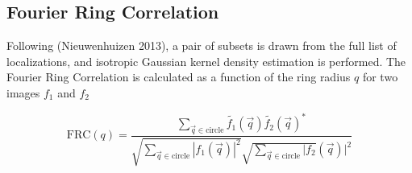 \documentclass{ucetd}
\begin{document}






\subsection{Fourier Ring Correlation}

Following (Nieuwenhuizen 2013), a pair of subsets is drawn from the full list of localizations, and isotropic Gaussian kernel density estimation is performed. The Fourier Ring Correlation is calculated as a function of the ring radius $q$ for two images $f_{1}$ and $f_{2}$

\begin{equation*}
\mathrm{FRC}(q) = \frac{\sum_{\vec{q}\in\mathrm{circle}}\tilde{f_{1}}(\vec{q})\tilde{f_{2}}(\vec{q})^{*}}{\sqrt{\sum_{\vec{q}\in\mathrm{circle}}|f_{1}(\vec{q})|^{2}}\sqrt{\sum_{\vec{q}\in\mathrm{circle}}|f_{2}}(\vec{q})|^{2}}
\end{equation*}
\end{document}
